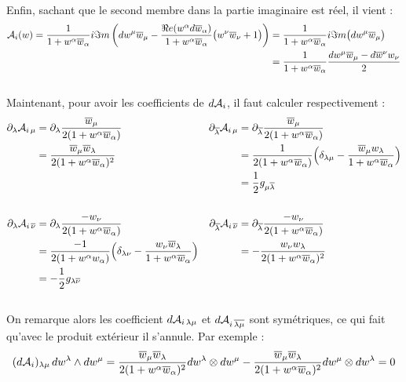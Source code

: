 \\
Enfin, sachant que le second membre dans la partie imaginaire est réel, il vient :
\begin{align*}
	\mathcal{A}_i(w) = \frac{1}{1 + w^\alpha\overline{w}_\alpha} i\Im m \left( dw^\mu\overline{w}_\mu -  \frac{\Re e(w^\alpha d\overline{w}_\alpha)}{1 + w^\alpha\overline{w}_\alpha}\big( w^\nu\overline{w}_\nu +1 \big) \right) 
	&= \frac{1}{1 + w^\alpha\overline{w}_\alpha} i\Im m \big( dw^\mu\overline{w}_\mu \big) \\
	&= \frac{1}{1 + w^\alpha\overline{w}_\alpha} \frac{dw^\mu\overline{w}_\mu -  d\overline{w}^\nu w_\nu }{2}
\end{align*}
\\

Maintenant, pour avoir les coefficients de $d\mathcal{A}_i$, il faut calculer respectivement :
\begin{align*}
	\partial_\lambda \mathcal{A}_{i\, \mu} &= \partial_\lambda \frac{\overline{w}_\mu}{2(1 + w^\alpha\overline{w}_\alpha)}  &  
		\partial_{\overline{\lambda}} \mathcal{A}_{i\, \mu} &= \partial_{\overline{\lambda}} \frac{\overline{w}_\mu}{2(1 + w^\alpha\overline{w}_\alpha)}
	\\
	&= \frac{\overline{w}_\mu\overline{w}_\lambda}{2(1 + w^\alpha\overline{w}_\alpha)^2}  &  
		&=  \frac{1}{2(1 + w^\alpha\overline{w}_\alpha)} \Big( \delta_{\lambda\mu} - \frac{\overline{w}_\mu w_\lambda}{1 + w^\alpha\overline{w}_\alpha}\Big) \\
	& &  &= \frac{1}{2} g_{\mu \overline{\lambda}}
	\\ \\
	\partial_\lambda \mathcal{A}_{i\, \overline{\nu}} &= \partial_{\lambda} \frac{ -w_\nu}{2(1 + w^\alpha\overline{w}_\alpha)}  &  
		\partial_{\overline{\lambda}} \mathcal{A}_{i\, \overline{\nu}} &= \partial_{\overline{\lambda}} \frac{ -w_\nu}{2(1 + w^\alpha\overline{w}_\alpha)}
	\\
	&=  \frac{-1}{2(1 + w^\alpha w_\alpha)} \Big( \delta_{\lambda\nu} - \frac{ w_\nu \overline{w}_\lambda}{1 + w^\alpha\overline{w}_\alpha}\Big)  &
		&= -\frac{ w_\nu w_\lambda}{2(1 + w^\alpha\overline{w}_\alpha)^2} \\
	&= -\frac{1}{2} g_{\lambda \overline{\nu}}
\end{align*}
\\
On remarque alors les coefficient $d\mathcal{A}_{i\, \lambda \mu}$ et $d\mathcal{A}_{i\, \overline{\lambda \mu}}$ sont symétriques, ce qui fait qu'avec le produit extérieur il s'annule. Par exemple :
\[(d\mathcal{A}_i)_{\lambda \mu}\, dw^\lambda \wedge dw^\mu = \frac{\overline{w}_\mu\overline{w}_\lambda}{2(1 + w^\alpha\overline{w}_\alpha)^2} dw^\lambda \otimes dw^\mu - \frac{\overline{w}_\mu\overline{w}_\lambda}{2(1 + w^\alpha\overline{w}_\alpha)^2} dw^\mu \otimes dw^\lambda = 0\]
